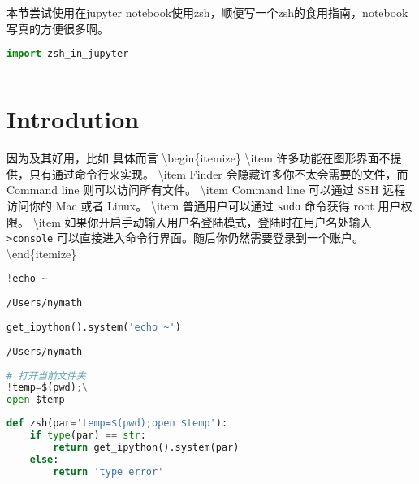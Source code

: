 \documentclass[
]{article}
\author{}
\date{}
\newcommand{\passthrough}[1]{#1}
\begin{document}
\leavevmode{}%
本节尝试使用在jupyter
notebook使用zsh，顺便写一个zsh的食用指南，notebook写真的方便很多啊。

\hypertarget{2f391477}{}
\begin{lstlisting}[language=Python]
import zsh_in_jupyter
\end{lstlisting}

\hypertarget{5198530e}{}
\begin{lstlisting}[language=Python]
\end{lstlisting}

\hypertarget{426de12e}{}
\hypertarget{introdution}{%
\section{Introdution}\label{introdution}}

因为及其好用，比如 具体而言 \textbackslash begin\{itemize\}
\textbackslash item 许多功能在图形界面不提供，只有通过命令行来实现。
\textbackslash item Finder 会隐藏许多你不太会需要的文件，而 Command line
则可以访问所有文件。 \textbackslash item Command line 可以通过 SSH
远程访问你的 Mac 或者 Linux。 \textbackslash item 普通用户可以通过
\passthrough{\lstinline!sudo!} 命令获得 root 用户权限。
\textbackslash item
如果你开启手动输入用户名登陆模式，登陆时在用户名处输入
\passthrough{\lstinline!>console!}
可以直接进入命令行界面。随后你仍然需要登录到一个账户。
\textbackslash end\{itemize\}

\hypertarget{37695442}{}
\begin{lstlisting}[language=Python]
!echo ~
\end{lstlisting}

\begin{lstlisting}
/Users/nymath
\end{lstlisting}

\hypertarget{a302ba1e}{}
\begin{lstlisting}[language=Python]
get_ipython().system('echo ~')
\end{lstlisting}

\begin{lstlisting}
/Users/nymath
\end{lstlisting}

\hypertarget{a524a580}{}
\begin{lstlisting}[language=Python]
# 打开当前文件夹
!temp=$(pwd);\
open $temp
\end{lstlisting}

\hypertarget{4831e23d}{}
\begin{lstlisting}[language=Python]
def zsh(par='temp=$(pwd);open $temp'):
    if type(par) == str:
        return get_ipython().system(par)
    else:
        return 'type error'
\end{lstlisting}
\end{document}
